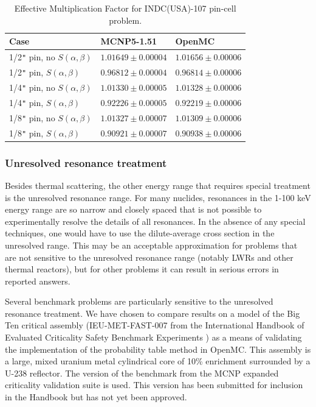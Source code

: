 \documentclass[authoryear,preprint]{elsarticle}
\begin{document}
\begin{table}
  \caption{Effective Multiplication Factor for INDC(USA)-107 pin-cell problem.}
  \label{tab:pincell}
  \begin{center}
  \begin{tabular}{ l l l }
    \toprule
    Case & MCNP5-1.51 & OpenMC \\
    \midrule
    1/2\verb+"+ pin, no $S(\alpha,\beta)$ & $1.01649 \pm 0.00004$ & $1.01656 \pm 0.00006$ \\
    1/2\verb+"+ pin, $S(\alpha,\beta)$    & $0.96812 \pm 0.00004$ & $0.96814 \pm 0.00006$ \\
    1/4\verb+"+ pin, no $S(\alpha,\beta)$ & $1.01330 \pm 0.00005$ & $1.01328 \pm 0.00006$ \\
    1/4\verb+"+ pin, $S(\alpha,\beta)$    & $0.92226 \pm 0.00005$ & $0.92219 \pm 0.00006$ \\
    1/8\verb+"+ pin, no $S(\alpha,\beta)$ & $1.01327 \pm 0.00007$ & $1.01309 \pm 0.00006$ \\
    1/8\verb+"+ pin, $S(\alpha,\beta)$    & $0.90921 \pm 0.00007$ & $0.90938 \pm 0.00006$ \\
    \bottomrule
  \end{tabular}
  \end{center}
\end{table}

\subsubsection{Unresolved resonance treatment}

Besides thermal scattering, the other energy range that requires special
treatment is the unresolved resonance range. For many nuclides, resonances in
the 1-100 keV energy range are so narrow and closely spaced that is not possible
to experimentally resolve the details of all resonances. In the absence of any
special techniques, one would have to use the dilute-average cross section in
the unresolved range. This may be an acceptable approximation for problems that
are not sensitive to the unresolved resonance range (notably LWRs and other
thermal reactors), but for other problems it can result in serious errors in
reported answers.

Several benchmark problems are particularly sensitive to the unresolved
resonance treatment. We have chosen to compare results on a model of the Big Ten
critical assembly (IEU-MET-FAST-007 from the International Handbook of Evaluated
Criticality Safety Benchmark Experiments \citep{icsbep}) as a means of
validating the implementation of the probability table method in OpenMC. This
assembly is a large, mixed uranium metal cylindrical core of 10\% enrichment
surrounded by a U-238 reflector. The version of the benchmark from the MCNP
expanded criticality validation suite \citep{mcnp-validation} is used. This
version has been submitted for inclusion in the Handbook but has not yet been
approved.
\end{document}
